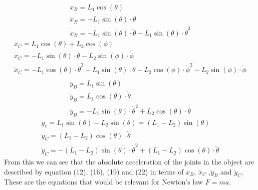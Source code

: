 \documentclass[11pt, a4paper]{article}
\begin{document}
\begin{gather}
    x_B = L_1\cos(\theta)\\
    \dot{x}_B = -L_1\sin(\theta) \cdot \dot{\theta}\\
    \ddot{x}_B = -L_1\sin(\theta) \cdot \ddot{\theta} - L_1\sin(\theta) \cdot \dot{\theta}^2
\end{gather}
\begin{gather}
    x_C = L_1\cos(\theta) + L_2\cos(\phi)\\
    \dot{x}_C = -L_1\sin(\theta)\cdot \dot{\theta} - L_2\sin(\phi) \cdot \dot{\phi}\\
    \ddot{x}_C = -L_1\cos(\theta)\cdot \dot{\theta}^2 - L_1\sin(\theta) \cdot \ddot{\theta} - L_2\cos(\phi) \cdot \dot{\phi}^2 - L_2\sin(\phi)\cdot \ddot{\phi}\\
\end{gather}
\begin{gather}
    y_B = L_1\sin(\theta)\\
    \dot{y}_B = L_1\cos(\theta) \cdot \dot{\theta}\\
    \ddot{y}_B = -L_1\sin(\theta) \cdot \dot{\theta}^2 + L_2\cos(\theta)\cdot \ddot{\theta}
\end{gather}
\begin{gather}
    y_c = L_1\sin(\theta) - L_2\sin(\theta) = (L_1 - L_2)\sin(\theta)\\
    \dot{y}_C = (L_1 - L_2)\cos(\theta) \cdot \dot{\theta}\\
    \ddot{y}_C = -(L_1 - L_2)\sin(\theta) \cdot \dot{\theta}^2 + (L_1 - L_2)\cos(\theta) \cdot \ddot{\theta}
\end{gather}
From this we can see that the absolute acceleration of the joints in the object are described by equation (12), (16), (19) and (22) in terms of $\ddot{x}_B$, $\ddot{x}_C$ ,$\ddot{y}_B$ and $\ddot{y}_C$. These are the equations that would be relevant for Newton's law $F = ma$.
\end{document}
